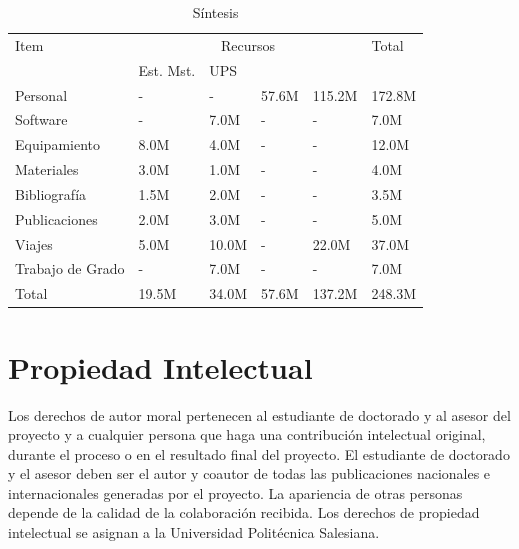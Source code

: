 \documentclass[12pt,a4paper]{article}
\begin{document}
\begin{table}[H]
\caption{Síntesis}
\begin{tabular}{|p{7.0cm}|p{1.1cm}|p{1.1cm}|p{1.1cm}|p{1.1cm}|p{1.1cm}|} \hline
Item & \multicolumn{4}{|c|}{Recursos} & Total \\ \cline{2-5}
  & Est. Mst. & UPS \\ \hline \hline

Personal          & -    & -    & 57.6M & 115.2M & 172.8M \\ \hline
Software          & -    & 7.0M & -     & -      & 7.0M   \\ \hline
Equipamiento      & 8.0M & 4.0M & -     & -      & 12.0M  \\ \hline
Materiales        & 3.0M & 1.0M & -     & -      & 4.0M   \\ \hline
Bibliografía      & 1.5M & 2.0M & -     & -      & 3.5M   \\ \hline
Publicaciones     & 2.0M & 3.0M & -     & -      & 5.0M   \\ \hline
Viajes            & 5.0M & 10.0M& -     & 22.0M  &37.0M   \\ \hline
Trabajo de Grado  & -    & 7.0M & -     & -      & 7.0M   \\ \hline
Total             &19.5M & 34.0M& 57.6M & 137.2M & 248.3M \\ \hline
\end{tabular}
\end{table}


\section{Propiedad Intelectual}
Los derechos de autor moral pertenecen al estudiante de doctorado y al asesor del proyecto y a cualquier persona que haga una contribución intelectual original, durante el proceso o en el resultado final del proyecto. El estudiante de doctorado y el asesor deben ser el autor y coautor de todas las publicaciones nacionales e internacionales generadas por el proyecto. La apariencia de otras personas depende de la calidad de la colaboración recibida. Los derechos de propiedad intelectual se asignan a la Universidad Politécnica Salesiana. 
\\
 

\vfill
\end{document}
